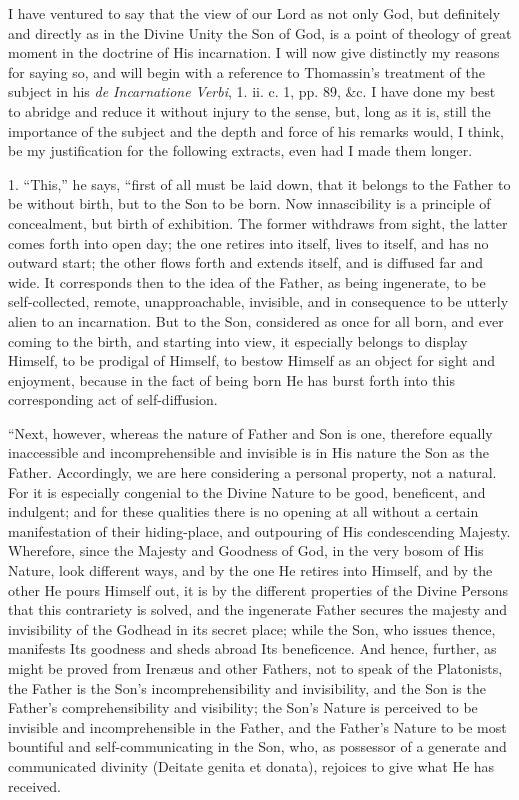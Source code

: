 I have ventured to say that the view of our Lord as not only
God, but definitely and directly as in the Divine Unity the Son of
God, is a point of theology of great moment in the doctrine of His
incarnation. I will now give distinctly my reasons for saying so, and
will begin with a reference to Thomassin's treatment of the subject in
his \emph{de Incarnatione Verbi}, 1. ii. c. 1, pp. 89, \&c. I have
done my best to abridge and reduce it without injury to the sense,
but, long as it is, still the importance of the subject and the depth
and force of his remarks would, I think, be my justification for the
following extracts, even had I made them longer.

1. ``This,'' he says, ``first of all must be laid down,
that it belongs to the Father to be without birth, but to the Son to
be born. Now innascibility is a principle of concealment, but birth of
exhibition. The former withdraws from sight, the latter comes forth
into open day; the one retires into itself, lives to itself, and has
no outward start; the other flows forth and extends itself, and is
diffused far and wide. It corresponds then to the idea of the Father,
as being ingenerate, to be self-collected, remote, unapproachable,
invisible, and in consequence to be utterly alien to an incarnation.
But to the Son, considered as once for all born, and ever coming to
the birth, and starting into view, it especially belongs to display
Himself, to be prodigal of Himself, to bestow Himself as an
object for sight and enjoyment, because in the fact of being born He
has burst forth into this corresponding act of self-diffusion.

``Next, however, whereas the nature of Father and Son is one,
therefore equally inaccessible and incomprehensible and invisible is
in His nature the Son as the Father. Accordingly, we are here
considering a personal property, not a natural. For it is especially
congenial to the Divine Nature to be good, beneficent, and indulgent;
and for these qualities there is no opening at all without a certain
manifestation of their hiding-place, and outpouring of His
condescending Majesty. Wherefore, since the Majesty and Goodness of
God, in the very bosom of His Nature, look different ways, and by the
one He retires into Himself, and by the other He pours Himself out, it
is by the different properties of the Divine Persons that this
contrariety is solved, and the ingenerate Father secures the majesty
and invisibility of the Godhead in its secret place; while the Son,
who issues thence, manifests Its goodness and sheds abroad Its
beneficence. And hence, further, as might be proved from Irenæus and
other Fathers, not to speak of the Platonists, the Father is the Son's
incomprehensibility and invisibility, and the Son is the Father's
comprehensibility and visibility; the Son's Nature is perceived to be
invisible and incomprehensible in the Father, and the Father's Nature
to be most bountiful and self-communicating in the Son, who, as
possessor of a generate and communicated divinity (Deitate genita et
donata), rejoices to give what He has received.

